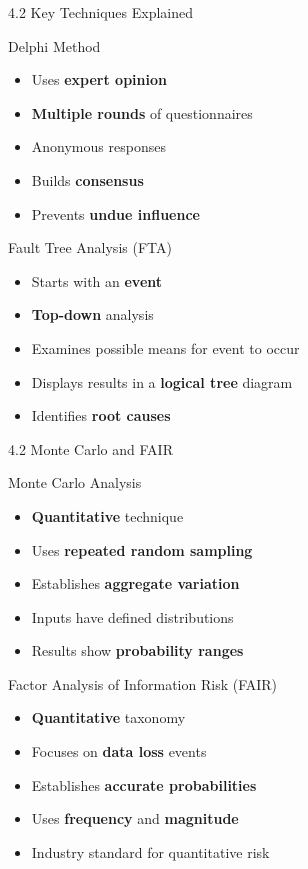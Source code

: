\documentclass[9pt]{beamer}  %
\begin{document}
	\begin{frame}{4.2 Key Techniques Explained}
		\begin{block}{Delphi Method}
			\begin{itemize}
				\item Uses \textbf{expert opinion}
				\item \textbf{Multiple rounds} of questionnaires
				\item Anonymous responses
				\item Builds \textbf{consensus}
				\item Prevents \textbf{undue influence}
			\end{itemize}
		\end{block}
		
		\begin{block}{Fault Tree Analysis (FTA)}
			\begin{itemize}
				\item Starts with an \textbf{event}
				\item \textbf{Top-down} analysis
				\item Examines possible means for event to occur
				\item Displays results in a \textbf{logical tree} diagram
				\item Identifies \textbf{root causes}
			\end{itemize}
		\end{block}
	\end{frame}
	
	\begin{frame}{4.2 Monte Carlo and FAIR}
		\begin{block}{Monte Carlo Analysis}
			\begin{itemize}
				\item \textbf{Quantitative} technique
				\item Uses \textbf{repeated random sampling}
				\item Establishes \textbf{aggregate variation}
				\item Inputs have defined distributions
				\item Results show \textbf{probability ranges}
			\end{itemize}
		\end{block}
		
		\begin{block}{Factor Analysis of Information Risk (FAIR)}
			\begin{itemize}
				\item \textbf{Quantitative} taxonomy
				\item Focuses on \textbf{data loss} events
				\item Establishes \textbf{accurate probabilities}
				\item Uses \textbf{frequency} and \textbf{magnitude}
				\item Industry standard for quantitative risk
			\end{itemize}
		\end{block}
	\end{frame}
	
\end{document}
